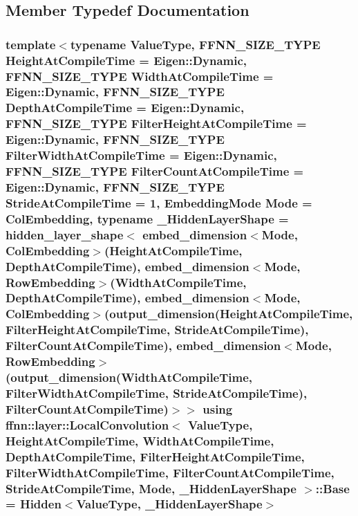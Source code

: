\subsection{Member Typedef Documentation}
\hypertarget{classffnn_1_1layer_1_1_local_convolution_a743892f65df49f80cd171a1254cb7548}{
\subsubsection[{Base}]{\setlength{\rightskip}{0pt plus 5cm}template$<$typename Value\-Type, F\-F\-N\-N\-\_\-\-S\-I\-Z\-E\-\_\-\-T\-Y\-P\-E Height\-At\-Compile\-Time = Eigen\-::\-Dynamic, F\-F\-N\-N\-\_\-\-S\-I\-Z\-E\-\_\-\-T\-Y\-P\-E Width\-At\-Compile\-Time = Eigen\-::\-Dynamic, F\-F\-N\-N\-\_\-\-S\-I\-Z\-E\-\_\-\-T\-Y\-P\-E Depth\-At\-Compile\-Time = Eigen\-::\-Dynamic, F\-F\-N\-N\-\_\-\-S\-I\-Z\-E\-\_\-\-T\-Y\-P\-E Filter\-Height\-At\-Compile\-Time = Eigen\-::\-Dynamic, F\-F\-N\-N\-\_\-\-S\-I\-Z\-E\-\_\-\-T\-Y\-P\-E Filter\-Width\-At\-Compile\-Time = Eigen\-::\-Dynamic, F\-F\-N\-N\-\_\-\-S\-I\-Z\-E\-\_\-\-T\-Y\-P\-E Filter\-Count\-At\-Compile\-Time = Eigen\-::\-Dynamic, F\-F\-N\-N\-\_\-\-S\-I\-Z\-E\-\_\-\-T\-Y\-P\-E Stride\-At\-Compile\-Time = 1, Embedding\-Mode Mode = Col\-Embedding, typename \-\_\-\-Hidden\-Layer\-Shape = hidden\-\_\-layer\-\_\-shape$<$              embed\-\_\-dimension$<$\-Mode, Col\-Embedding$>$(\-Height\-At\-Compile\-Time, Depth\-At\-Compile\-Time),              embed\-\_\-dimension$<$\-Mode, Row\-Embedding$>$(\-Width\-At\-Compile\-Time,  Depth\-At\-Compile\-Time),              embed\-\_\-dimension$<$\-Mode, Col\-Embedding$>$(output\-\_\-dimension(\-Height\-At\-Compile\-Time, Filter\-Height\-At\-Compile\-Time, Stride\-At\-Compile\-Time), Filter\-Count\-At\-Compile\-Time),              embed\-\_\-dimension$<$\-Mode, Row\-Embedding$>$(output\-\_\-dimension(\-Width\-At\-Compile\-Time,  Filter\-Width\-At\-Compile\-Time,  Stride\-At\-Compile\-Time), Filter\-Count\-At\-Compile\-Time)$>$$>$ using {\bf ffnn\-::layer\-::\-Local\-Convolution}$<$ Value\-Type, Height\-At\-Compile\-Time, Width\-At\-Compile\-Time, Depth\-At\-Compile\-Time, Filter\-Height\-At\-Compile\-Time, Filter\-Width\-At\-Compile\-Time, Filter\-Count\-At\-Compile\-Time, Stride\-At\-Compile\-Time, Mode, \-\_\-\-Hidden\-Layer\-Shape $>$\-::{\bf Base} =  {\bf Hidden}$<$Value\-Type, \-\_\-\-Hidden\-Layer\-Shape$>$}}\label{classffnn_1_1layer_1_1_local_convolution_a743892f65df49f80cd171a1254cb7548}


